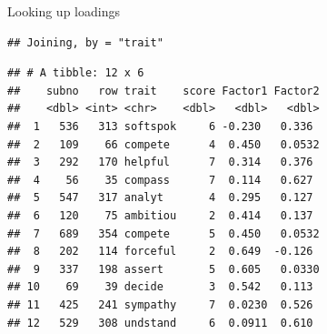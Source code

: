 \documentclass[ignorenonframetext,]{beamer}
\newenvironment{Shaded}{\begin{snugshade}}{\end{snugshade}}
\newcommand{\DecValTok}[1]{\textcolor[rgb]{0.00,0.00,0.81}{#1}}
\newcommand{\KeywordTok}[1]{\textcolor[rgb]{0.13,0.29,0.53}{\textbf{#1}}}
\newcommand{\NormalTok}[1]{#1}
\newcommand{\OperatorTok}[1]{\textcolor[rgb]{0.81,0.36,0.00}{\textbf{#1}}}
\newcommand{\StringTok}[1]{\textcolor[rgb]{0.31,0.60,0.02}{#1}}
\begin{document}
\begin{frame}[fragile]{Looking up loadings}
\protect\hypertarget{looking-up-loadings}{}

\scriptsize

\begin{Shaded}
\end{Shaded}

\begin{verbatim}
## Joining, by = "trait"
\end{verbatim}

\begin{Shaded}
\end{Shaded}

\begin{verbatim}
## # A tibble: 12 x 6
##    subno   row trait    score Factor1 Factor2
##    <dbl> <int> <chr>    <dbl>   <dbl>   <dbl>
##  1   536   313 softspok     6 -0.230   0.336 
##  2   109    66 compete      4  0.450   0.0532
##  3   292   170 helpful      7  0.314   0.376 
##  4    56    35 compass      7  0.114   0.627 
##  5   547   317 analyt       4  0.295   0.127 
##  6   120    75 ambitiou     2  0.414   0.137 
##  7   689   354 compete      5  0.450   0.0532
##  8   202   114 forceful     2  0.649  -0.126 
##  9   337   198 assert       5  0.605   0.0330
## 10    69    39 decide       3  0.542   0.113 
## 11   425   241 sympathy     7  0.0230  0.526 
## 12   529   308 undstand     6  0.0911  0.610
\end{verbatim}

\normalsize

\end{frame}
\end{document}
